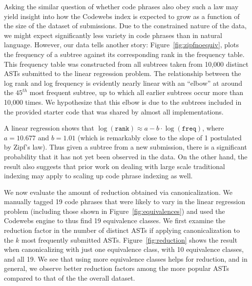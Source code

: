 Asking the similar question of whether code phrases also obey such a law may yield
insight into how the Codewebs index is expected to grow as a function of the size of the dataset of submissions.
Due to the constrained nature of the data, we might expect significantly 
less variety in code phrases than in natural language.  However, our data tells another story: Figure~\ref{fig:zipfnoequiv},
plots the frequency of a subtree against its corresponding rank in the frequency table.  This frequency table was constructed 
from all subtrees taken from 10,000 distinct ASTs submitted to the linear regression problem.
The relationship between the log rank and log frequency is evidently nearly linear
 with an ``elbow'' at around the $45^{th}$ most frequent subtree, up to which all earlier subtrees occur more than 10,000 times.  
 We hypothesize that this elbow is due to the subtrees included in the provided starter code that was shared by almost all implementations.

A linear regression shows that $\log (\texttt{rank}) \approx a- b\cdot\log (\texttt{freq})$, where $a=10.677$
and $b=1.01$ (which is remarkably close to the slope of 1 postulated by Zipf's law). 
Thus given a subtree from a new submission, there is a significant probability that it has not yet 
been observed in the data.  On the other hand, the result also suggests that prior work on dealing with large scale traditional indexing may apply to
scaling up code phrase indexing as well.

We now evaluate the amount of reduction obtained via canonicalization.  We 
manually tagged 19 code phrases that were likely to vary in the linear regression problem (including those shown in Figure~\ref{fig:equivalences})
and used the Codewebs engine to thus find 19 equivalence classes.
We first examine the reduction factor in the number of distinct ASTs
if applying canonicalization to the $k$ most frequently submitted ASTs.
Figure~\ref{fig:reduction} shows the result when canonicalizing with just one equivalence
class, with 10 equivalence classes, and all 19.  We see that using more equivalence classes
helps for reduction, and in general, we observe better reduction factors among the more popular
ASTs compared to that of the the overall dataset.

